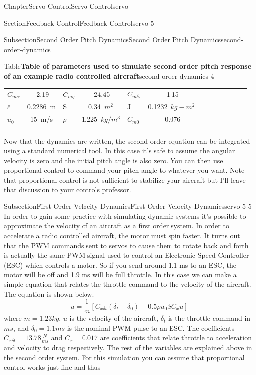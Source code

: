 \documentclass[oneside,10pt,]{book}
\numberwithin{equation}{section}
\newcommand{\hrulethin}  {\noalign{\hrule height 0.04em}}
\begin{document}
\begin{chapterptx}{Chapter}{Servo Control}{}{Servo Control}{}{}{servo}
\begin{sectionptx}{Section}{Feedback Control}{}{Feedback Control}{}{}{servo-5}
\begin{subsectionptx}{Subsection}{Second Order Pitch Dynamics}{}{Second Order Pitch Dynamics}{}{}{second-order-dynamics}
\begin{tableptx}{Table}{\textbf{Table of parameters used to simulate second order pitch response of an example radio controlled aircraft}}{second-order-dynamics-4}{}
{\begin{tabular}{AcAcAcAcAcAcA}
\(C_{m\alpha}\)&-2.19&\(C_{mq}\)&-24.45&\(C_{m\delta_e}\)&-1.15\tabularnewline\hrulethin
\(\bar{c}\)&0.2286~m&S&0.34~\(m^2\)&J&0.1232~\(kg-m^2\)\tabularnewline\hrulethin
\(u_0\)&15~m\slash{}s&\(\rho\)&1.225~\(kg/m^3\)&\(C_{m0}\)&-0.076\tabularnewline\hrulethin
\end{tabular}
}%
\end{tableptx}%
Now that the dynamics are written, the second order equation can be integrated using a standard numerical tool. In this case it's safe to assume the angular velocity is zero and the initial pitch angle is also zero. You can then use proportional control to command your pitch angle to whatever you want. Note that proportional control is not sufficient to stabilize your aircraft but I'll leave that discussion to your controls professor.%
\end{subsectionptx}
%
%
\typeout{************************************************}
\typeout{************************************************}
%
\begin{subsectionptx}{Subsection}{First Order Velocity Dynamics}{}{First Order Velocity Dynamics}{}{}{servo-5-5}
In order to gain some practice with simulating dynamic systems it's possible to approximate the velocity of an aircraft as a first order system. In order to accelerate a radio controlled aircraft, the motor must spin faster. It turns out that the PWM commands sent to servos to cause them to rotate back and forth is actually the same PWM signal used to control an Electronic Speed Controller (ESC) which controls a motor. So if you send around 1.1 ms to an ESC, the motor will be off and 1.9 ms will be full throttle. In this case we can make a simple equation that relates the throttle command to the velocity of the aircraft. The equation is shown below.%
\begin{equation}
\dot{u} = \frac{1}{m}[C_{x\delta t} (\delta_t-\delta_0) - 0.5\rho u_0 S C_x u]\label{e_first-order}
\end{equation}
where \(m=1.23 kg\), \(u\) is the velocity of the aircraft, \(\delta_t\) is the throttle command in \(ms\), and \(\delta_0=1.1 ms\) is the nominal PWM pulse to an ESC. The coefficients \(C_{x\delta t}=13.78 \frac{N}{ms}\) and \(C_x=0.017\) are coefficients that relate throttle to acceleration and velocity to drag respectively. The rest of the variables are explained above in the second order system. For this simulation you can assume that proportional control works just fine and thus%
\begin{equation}

\end{equation}
\end{subsectionptx}
\end{sectionptx}
\end{chapterptx}
\end{document}
